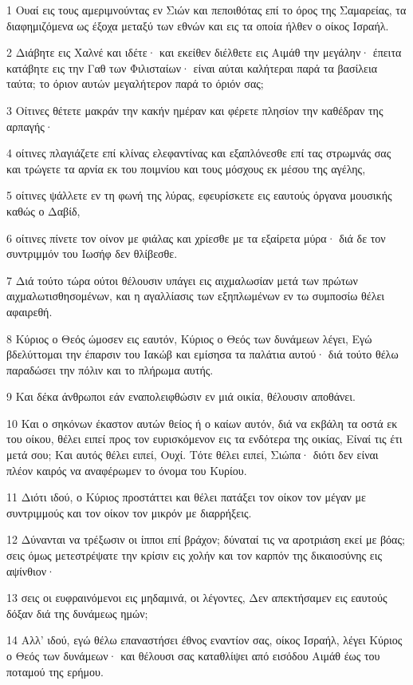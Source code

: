 \par 1 Ουαί εις τους αμεριμνούντας εν Σιών και πεποιθότας επί το όρος της Σαμαρείας, τα διαφημιζόμενα ως έξοχα μεταξύ των εθνών και εις τα οποία ήλθεν ο οίκος Ισραήλ.
\par 2 Διάβητε εις Χαλνέ και ιδέτε· και εκείθεν διέλθετε εις Αιμάθ την μεγάλην· έπειτα κατάβητε εις την Γαθ των Φιλισταίων· είναι αύται καλήτεραι παρά τα βασίλεια ταύτα; το όριον αυτών μεγαλήτερον παρά το όριόν σας;
\par 3 Οίτινες θέτετε μακράν την κακήν ημέραν και φέρετε πλησίον την καθέδραν της αρπαγής·
\par 4 οίτινες πλαγιάζετε επί κλίνας ελεφαντίνας και εξαπλόνεσθε επί τας στρωμνάς σας και τρώγετε τα αρνία εκ του ποιμνίου και τους μόσχους εκ μέσου της αγέλης,
\par 5 οίτινες ψάλλετε εν τη φωνή της λύρας, εφευρίσκετε εις εαυτούς όργανα μουσικής καθώς ο Δαβίδ,
\par 6 οίτινες πίνετε τον οίνον με φιάλας και χρίεσθε με τα εξαίρετα μύρα· διά δε τον συντριμμόν του Ιωσήφ δεν θλίβεσθε.
\par 7 Διά τούτο τώρα ούτοι θέλουσιν υπάγει εις αιχμαλωσίαν μετά των πρώτων αιχμαλωτισθησομένων, και η αγαλλίασις των εξηπλωμένων εν τω συμποσίω θέλει αφαιρεθή.
\par 8 Κύριος ο Θεός ώμοσεν εις εαυτόν, Κύριος ο Θεός των δυνάμεων λέγει, Εγώ βδελύττομαι την έπαρσιν του Ιακώβ και εμίσησα τα παλάτια αυτού· διά τούτο θέλω παραδώσει την πόλιν και το πλήρωμα αυτής.
\par 9 Και δέκα άνθρωποι εάν εναπολειφθώσιν εν μιά οικία, θέλουσιν αποθάνει.
\par 10 Και ο σηκόνων έκαστον αυτών θείος ή ο καίων αυτόν, διά να εκβάλη τα οστά εκ του οίκου, θέλει ειπεί προς τον ευρισκόμενον εις τα ενδότερα της οικίας, Είναί τις έτι μετά σου; Και αυτός θέλει ειπεί, Ουχί. Τότε θέλει ειπεί, Σιώπα· διότι δεν είναι πλέον καιρός να αναφέρωμεν το όνομα του Κυρίου.
\par 11 Διότι ιδού, ο Κύριος προστάττει και θέλει πατάξει τον οίκον τον μέγαν με συντριμμούς και τον οίκον τον μικρόν με διαρρήξεις.
\par 12 Δύνανται να τρέξωσιν οι ίπποι επί βράχον; δύναταί τις να αροτριάση εκεί με βόας; σεις όμως μετεστρέψατε την κρίσιν εις χολήν και τον καρπόν της δικαιοσύνης εις αψίνθιον·
\par 13 σεις οι ευφραινόμενοι εις μηδαμινά, οι λέγοντες, Δεν απεκτήσαμεν εις εαυτούς δόξαν διά της δυνάμεως ημών;
\par 14 Αλλ' ιδού, εγώ θέλω επαναστήσει έθνος εναντίον σας, οίκος Ισραήλ, λέγει Κύριος ο Θεός των δυνάμεων· και θέλουσι σας καταθλίψει από εισόδου Αιμάθ έως του ποταμού της ερήμου.

